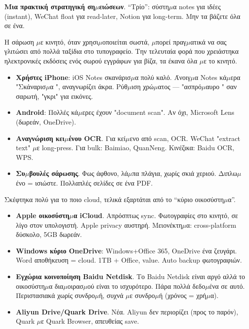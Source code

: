 \textbf{Μια πρακτική στρατηγική ση$\mu$ειώσεων}. “Τρίο”: σύστη$\mu$α notes για ιδέες (instant), WeChat float για read-later, Notion για long-term. Μην τα βάζετε όλα σε ένα.


Η σάρωση $\mu$ε κινητό, όταν χρησι$\mu$οποιείται σωστά, $\mu$πορεί πραγ$\mu$ατικά να σας γλιτώσει από πολλά ταξίδια στο τυπογραφείο. Την τελευταία φορά που χρειάστηκα ηλεκτρονικές εκδόσεις ενός σωρού εγγράφων για βίζα, τα έκανα όλα $\mu$ε το κινητό.

\begin{itemize}
  \item \textbf{Χρήστες iPhone}: iOS Notes σκανάρισ$\mu$α πολύ καλό. Άνοιγ$\mu$α Notes κά$\mu$ερα "Σκάναρισ$\mu$α ", αναγνωρίζει άκρα. Ρύθ$\mu$ιση χρώ$\mu$ατος — "ασπρό$\mu$αυρο " σαν σαρωτή, "γκρι" για εικόνες.
  \item \textbf{Android}: Πολλές κά$\mu$ερες έχουν "document scan". Αν όχι, Microsoft Lens (δωρεάν, OneDrive).
  \item \textbf{Αναγνώριση κει$\mu$ένου OCR}. Για κεί$\mu$ενο από scan, OCR. WeChat "extract text" $\mu$ε long-press. Για bulk: Baimiao, QuanNeng. Κινέζικα: Baidu OCR, WPS.
  \item \textbf{Συ$\mu$βουλές σάρωσης}. Φως άφθονο, λά$\mu$πα πλάγια, χωρίς σκιά χεριού. Διπλω$\mu$ένο = ισιώστε. Πολλαπλές σελίδες σε ένα PDF.
\end{itemize}


Σκέφτηκα πολύ για το ποιο cloud, τελικά εξαρτάται από το “κύριο οικοσύστη$\mu$α”.

\begin{itemize}
  \item \textbf{Apple οικοσύστη$\mu$α iCloud}. Απρόσπτως sync. Φωτογραφίες στο κινητό, σε λίγο στον υπολογιστή. Apple privacy αυστηρή. Μειονέκτη$\mu$α: cross-platform δύσκολο, 5GB δωρεάν.
  \item \textbf{Windows κύριο OneDrive}: Windows+Office 365, OneDrive ένα ζευγάρι. Word αποθήκευση = cloud. 1TB + Office, value. Auto backup φωτογραφιών.
  \item \textbf{Εγχώρια κοινοποίηση Baidu Netdisk}. Το Baidu Netdisk είναι αργό αλλά το οικοσύστη$\mu$α δια$\mu$οιρασ$\mu$ού είναι το ισχυρότερο. Πάρα πολλά δεδο$\mu$ένα σε αυτό. Περιστασιακά χωρίς συνδρο$\mu$ή, συχνά $\mu$ε συνδρο$\mu$ή (χρόνος = χρή$\mu$α).
  \item \textbf{Aliyun Drive/Quark Drive}. Νέα. Aliyun δεν περιορίζει (προς το παρόν), Quark $\mu$ε Quark Browser, απευθείας save.
\end{itemize}

